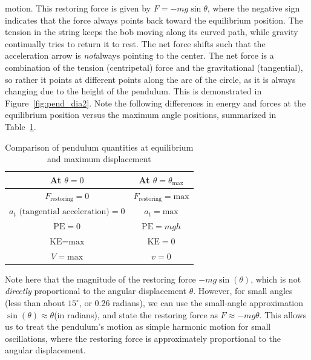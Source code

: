 motion. This restoring force is given by $F = -mg\sin\theta $, where the negative
sign indicates that the force always points back toward the equilibrium
position. The tension in the string keeps the bob moving along its curved path,
while gravity continually tries to return it to rest. The net force shifts such
that the acceleration arrow is \emph{not}always pointing to the center. The
net force is a combination of the tension (centripetal) force and the
gravitational (tangential), so rather it points at different points along the arc
of the circle, as it is always changing due to the height of the pendulum. This
is demonstrated in Figure~\ref{fig:pend_dia2}. Note the following differences in
energy and forces at the equilibrium position versus the maximum angle positions,
summarized in Table~\ref{tab:pendulum_states}.
\begin{table}[h!]
	\centering
	\begin{tabular}{|c|c|}
		\hline
		\textbf{At $\theta = 0$}                    & \textbf{At $\theta = \theta_{\max}$} \\
		\hline
		$F_{\text{restoring}}= 0$                   & $F_{\text{restoring}}= \text{max}$   \\
		$a_{t}\text{ (tangential acceleration)}= 0$ & $a_{t}= \text{max}$                  \\
		$\text{PE}= 0$                              & $\text{PE}= mgh$                     \\
		$\text{KE}= \text{max}$                     & $\text{KE}= 0$                       \\
		$V = \text{max}$                            & $v = 0$                              \\
		\hline
	\end{tabular}
	\caption{Comparison of pendulum quantities at equilibrium and maximum
	displacement}
	\label{tab:pendulum_states}
\end{table}
Note here that the magnitude of the restoring force $-mg\sin(\theta)$, which is not \emph{directly} proportional to the angular displacement $\theta $. However, for
small angles (less than about $15^\circ$, or 0.26 radians), we can use
the small-angle approximation $\sin(\theta) \approx \theta $(in radians), and state
the restoring force as $F \approx -mg\theta $. This allows us to treat the pendulum's motion as simple harmonic motion for small oscillations, where the restoring force
is approximately proportional to the angular displacement.
